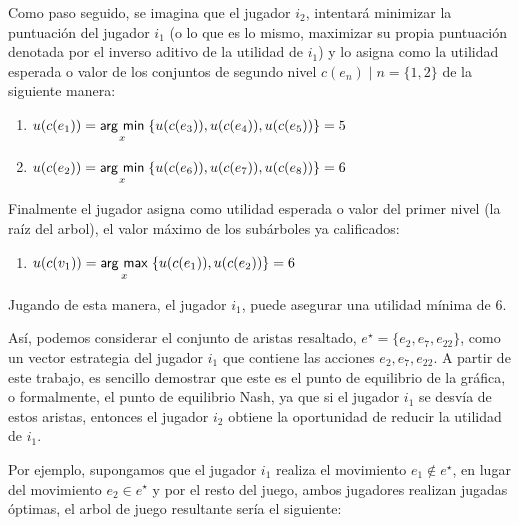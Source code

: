 Como paso seguido, se imagina que el jugador $i_{2}$, intentará minimizar la puntuación del jugador $i_{1}$ (o lo que es lo mismo, maximizar su propia puntuación denotada por el inverso aditivo de la utilidad de $i_{1}$) y lo asigna como la utilidad esperada o valor de los conjuntos de segundo nivel $c(e_{n}) \mid n = \{1,2\}$ de la siguiente manera:
	\begin{enumerate}
	\item $u(c(e_{1})) = \underset{x}{\operatorname{\mathsf{arg}}\,\operatorname{\mathsf{min}}}\; \{u(c(e_{3})), u(c(e_{4})),  u(c(e_{5}))\} = 5$ 
	\item $u(c(e_{2})) = \underset{x}{\operatorname{\mathsf{arg}}\,\operatorname{\mathsf{min}}}\; \{ u(c(e_{6})),  u(c(e_{7})),  u(c(e_{8}))\}= 6$
	\end{enumerate}

Finalmente el jugador asigna como utilidad esperada o valor del primer nivel (la raíz del arbol), el valor máximo de los subárboles ya calificados: 
\begin{enumerate}
\item $u(c(v_{1})) =\underset{x}{\operatorname{\mathsf{arg}}\,\operatorname{\mathsf{max}}}\; \{u(c(e_{1})) , u(c(e_{2})) \}=6$
\end{enumerate} 

Jugando de esta manera, el jugador $i_{1}$, puede asegurar una utilidad mínima de $6$. 

Así, podemos considerar el conjunto de aristas resaltado,  $e^\star = \{e_{2},e_{7},e_{22}\}$, como un vector estrategia del jugador $i_{1}$ que contiene las acciones $e_{2},e_{7},e_{22}$. A partir de este trabajo, es sencillo demostrar que este es el punto de equilibrio de la gráfica, o formalmente, el punto de equilibrio Nash, ya que si el jugador $i_{1}$ se desvía de estos aristas, entonces el jugador $i_{2}$ obtiene la oportunidad de reducir la utilidad de $i_{1}$. 

Por ejemplo, supongamos que el jugador $i_{1}$ realiza el movimiento $e_{1}\notin e^\star$, en lugar del movimiento $e_{2} \in e^\star$ y por el resto del juego, ambos jugadores realizan jugadas óptimas, el arbol de juego resultante sería el siguiente:

